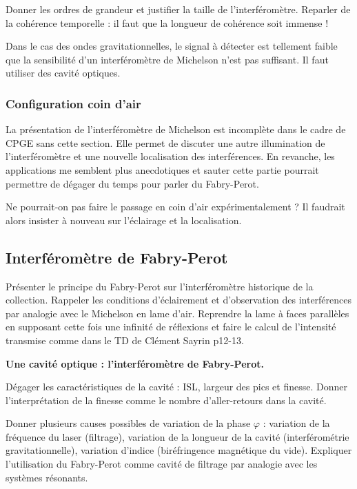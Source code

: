 Donner les ordres de grandeur et justifier la taille de l'interféromètre.
Reparler de la cohérence temporelle : il faut que la longueur de cohérence soit immense !

\begin{transition}
Dans le cas des ondes gravitationnelles, le signal à détecter est tellement faible que la sensibilité d'un interféromètre de Michelson n'est pas suffisant.
Il faut utiliser des cavité optiques.
\end{transition}

\subsubsection{Configuration coin d'air}

\begin{remarque}
La présentation de l'interféromètre de Michelson est incomplète dans le cadre de CPGE sans cette section.
Elle permet de discuter une autre illumination de l'interféromètre et une nouvelle localisation des interférences.
En revanche, les applications me semblent plus anecdotiques et sauter cette partie pourrait permettre de dégager du temps pour parler du Fabry-Perot.

\noindent
Ne pourrait-on pas faire le passage en coin d'air expérimentalement ?
Il faudrait alors insister à nouveau sur l'éclairage et la localisation.
\end{remarque}

\subsection{Interféromètre de Fabry-Perot}

Présenter le principe du Fabry-Perot sur l'interféromètre historique de la collection.
Rappeler les conditions d'éclairement et d'observation des interférences par analogie avec le Michelson en lame d'air.
Reprendre la lame à faces parallèles en supposant cette fois une infinité de réflexions et faire le calcul de l'intensité transmise comme dans le TD de Clément Sayrin p12-13.

\begin{slide}
\textbf{Une cavité optique : l'interféromètre de Fabry-Perot.}
\end{slide}
Dégager les caractéristiques de la cavité : ISL, largeur des pics et finesse.
Donner l'interprétation de la finesse comme le nombre d'aller-retours dans la cavité.

Donner plusieurs causes possibles de variation de la phase $\varphi$ : variation de la fréquence du laser (filtrage), variation de la longueur de la cavité (interférométrie gravitationnelle), variation d'indice (biréfringence magnétique du vide).
Expliquer l'utilisation du Fabry-Perot comme cavité de filtrage par analogie avec les systèmes résonants.

